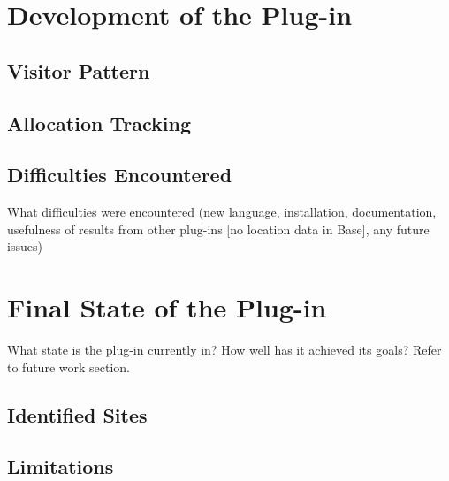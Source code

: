 \section{Development of the  Plug-in}

\subsection{Visitor Pattern}


\subsection{Allocation Tracking}


\subsection{Difficulties Encountered}

What difficulties were encountered (new language, installation, documentation, usefulness of results from other plug-ins [no location data in Base], any future issues)

\section{Final State of the Plug-in}

What state is the plug-in currently in? How well has it achieved its goals? Refer to future work section.

\subsection{Identified Sites}

\subsection{Limitations}
